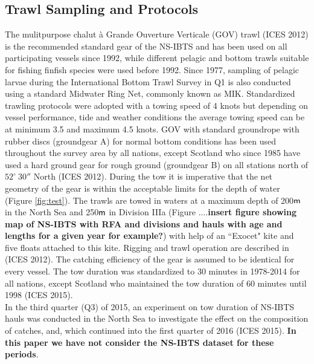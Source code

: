 \documentclass[a4paper 12pt]{article}
\numberwithin{equation}{section}
\newcommand{\m}{\textnormal{\sffamily m}\xspace}
\begin{document}
\subsection{Trawl Sampling and Protocols}
\label{trawlproto}
The mulitpurpose chalut {\`a} Grande Ouverture Verticale (GOV) trawl (ICES 2012) is the recommended standard gear of the NS-IBTS and has been used on all participating vessels since 1992, while different pelagic and bottom trawls suitable for fishing finfish species were used before 1992. Since 1977, sampling of pelagic larvae during the International Bottom Trawl Survey in Q1 is also conducted using a  standard Midwater Ring Net, commonly known as MIK. Standardized trawling protocols were adopted with a towing speed of 4 knots but depending on vessel performance, tide and weather conditions the average towing speed can be at minimum 3.5 and maximum 4.5 knots. GOV with standard groundrope with rubber discs (groundgear A) for normal bottom conditions has been used throughout the survey area by all nations, except Scotland who since 1985 have used a hard ground gear for rough ground (groundgear B) on all stations north of   $52^\circ  \ 30''$ North  (ICES 2012). During the tow it is imperative that the net geometry of the gear is within the acceptable limits for the depth of water (Figure \ref{fig:test}). The trawls are towed in waters at a maximum depth of 200$\m$ in the North Sea and 250$\m$ in Division IIIa (Figure ....{\bf insert figure showing map of NS-IBTS with RFA and divisions and hauls with age and lengths for a given year for example?}) with help of an ``Exocet"  kite and five floats attached to this kite. Rigging and trawl operation are described in (ICES 2012). The catching efficiency of the gear is assumed to be identical for every vessel. The tow duration was standardized to 30 minutes in 1978-2014 for all nations, except Scotland who maintained the tow duration of 60 minutes until 1998 (ICES 2015).  \\
\indent  In the third quarter (Q3) of 2015, an experiment on tow duration of NS-IBTS hauls was conducted in the North Sea to investigate the effect on the composition of catches, and, which continued into the first quarter of 2016 (ICES 2015). {\bf In this paper we have not consider the NS-IBTS dataset for these periods}.\\
\end{document}
